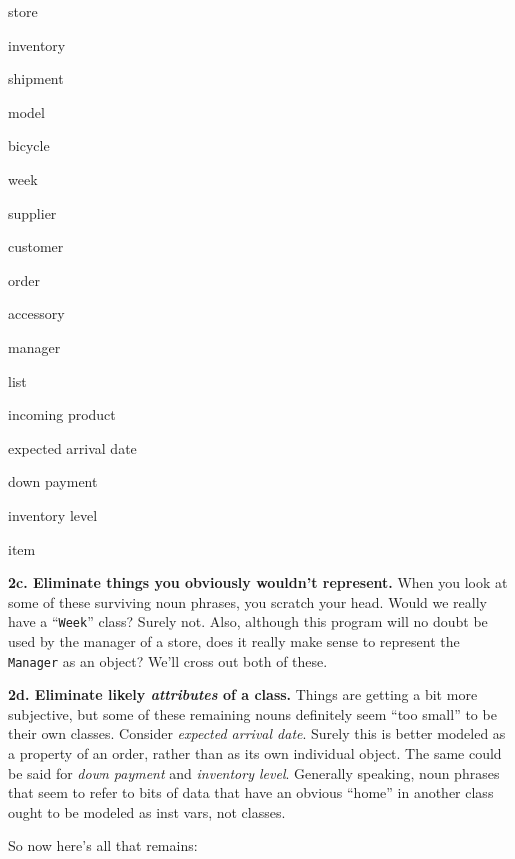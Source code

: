 \begin{multicols}{3}
\small
\begin{compactitem}
\item \textsf{store}
\item \textsf{inventory}
\item \textsf{shipment}
\item \textsf{model}
\item \textsf{bicycle}
\item \textsf{week}
\columnbreak
\item \textsf{supplier}
\item \textsf{customer}
\item \textsf{order}
\item \textsf{accessory}
\item \textsf{manager}
\columnbreak
\item \textsf{list}
\item \textsf{incoming product}
\item \textsf{expected arrival date}
\item \textsf{down payment}
\item \textsf{inventory level}
\item \textsf{item}
\end{compactitem}
\end{multicols}


\textbf{2c. Eliminate things you obviously wouldn't represent.} When you look
at some of these surviving noun phrases, you scratch your head. Would we
really have a ``\texttt{Week}'' class? Surely not. Also, although this program
will no doubt be used by the manager of a store, does it really make sense to
represent the \texttt{Manager} as an object? We'll cross out both of these.

\vspace{.2in}

\textbf{2d. Eliminate likely \textit{attributes} of a class.} Things are
getting a bit more subjective, but some of these remaining nouns definitely
seem ``too small'' to be their own classes. Consider \textit{expected arrival
date}. Surely this is better modeled as a property of an order, rather than as
its own individual object. The same could be said for \textit{down payment} and
\textit{inventory level}. Generally speaking, noun phrases that seem to refer
to bits of data that have an obvious ``home'' in another class ought to be
modeled as inst vars, not classes.

So now here's all that remains:

